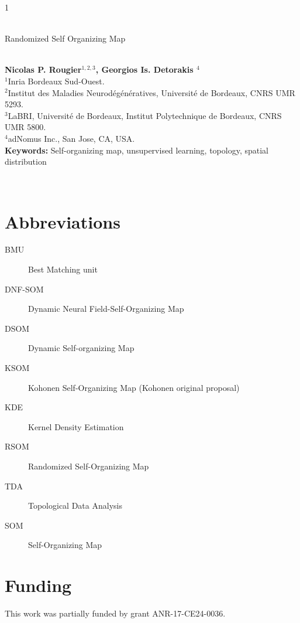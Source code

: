 





\hspace{13.9cm}1

\ \vspace{20mm}\\

{\LARGE Randomized Self Organizing Map}

\ \\
{\bf \large Nicolas P. Rougier$^{\displaystyle 1, \displaystyle 2, \displaystyle 3}$, Georgios Is. Detorakis $^{\displaystyle 4}$}\\
{$^{\displaystyle 1}$Inria Bordeaux Sud-Ouest.}\\
{$^{\displaystyle 2}$Institut des Maladies Neurodégénératives, Université  de Bordeaux, CNRS UMR 5293.}\\
{$^{\displaystyle 3}$LaBRI, Université de Bordeaux, Institut Polytechnique de Bordeaux, CNRS UMR 5800.}\\
{$^{\displaystyle 4}$adNomus Inc., San Jose, CA, USA.}\\
%

{\bf Keywords:} Self-organizing map, unsupervised learning, topology, spatial distribution 

\thispagestyle{empty}
%
\ \vspace{-0mm}\\
%
\begin{center} {\bf } \end{center}







\section*{Abbreviations}
\begin{description}
    \item[BMU]     Best Matching unit
    \item[DNF-SOM] Dynamic Neural Field-Self-Organizing Map
    \item[DSOM]    Dynamic Self-organizing Map
    \item[KSOM]    Kohonen Self-Organizing Map (Kohonen original proposal)
    \item[KDE]     Kernel Density Estimation
    \item[RSOM]    Randomized Self-Organizing Map
    \item[TDA]     Topological Data Analysis
    \item[SOM]     Self-Organizing Map
\end{description}

\section*{Funding}
This work was partially funded by grant ANR-17-CE24-0036.






\newpage
\appendix



